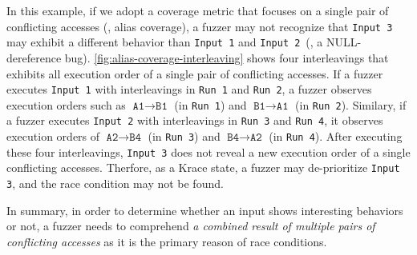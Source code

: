 In this example, if we adopt a coverage metric that focuses on a
single pair of conflicting accesses (\eg, alias coverage), a fuzzer
may not recognize that \texttt{Input 3} may exhibit a different
behavior than \texttt{Input 1} and \texttt{Input 2}~(\ie, a
NULL-dereference bug).
%
\autoref{fig:alias-coverage-interleaving} shows four interleavings
that exhibits all execution order of a single pair of conflicting
accesses. If a fuzzer executes \texttt{Input 1} with interleavings in
\texttt{Run 1} and \texttt{Run 2}, a fuzzer observes execution orders
such as $\texttt{A1} \rightarrow \texttt{B1}$ (in \texttt{Run 1}) and
$\texttt{B1} \rightarrow \texttt{A1}$ (in \texttt{Run 2}).
%
Similary, if a fuzzer executes \texttt{Input 2} with interleavings in
\texttt{Run 3} and \texttt{Run 4}, it observes execution orders of
$\texttt{A2} \rightarrow \texttt{B4}$ (in \texttt{Run 3}) and
$\texttt{B4} \rightarrow \texttt{A2}$ (in \texttt{Run 4}).
%
After executing these four interleavings, \texttt{Input 3} does not
reveal a new execution order of a single conflicting
accesses. Therfore, as a Krace state, a fuzzer may de-prioritize
\texttt{Input 3}, and the race condition may not be found.

In summary, in order to determine whether an input shows interesting
behaviors or not, a fuzzer needs to comprehend \textit{a combined
  result of multiple pairs of conflicting accesses} as it is the
primary reason of race conditions.



